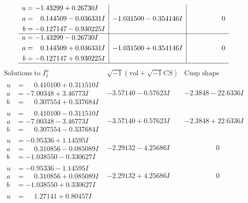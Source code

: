 \documentclass[1p]{elsarticle_modified}
\theoremstyle{definition}
\newcommand{\I}{\sqrt{-1}}
\begin{document}
$$\begin{array}{c|c|c}
\begin{aligned}
u &= -1.43299 + 0.26730 I \\
a &= \phantom{-}0.144509 - 0.036331 I \\
b &= -0.127147 - 0.930225 I\end{aligned}
 & -1.031500 - 0.354146 I & \phantom{-0.000000 } 0 \\ \hline\begin{aligned}
u &= -1.43299 - 0.26730 I \\
a &= \phantom{-}0.144509 + 0.036331 I \\
b &= -0.127147 + 0.930225 I\end{aligned}
 & -1.031500 + 0.354146 I & \phantom{-0.000000 } 0\\
 \hline 
 \end{array}$$\newpage$$\begin{array}{c|c|c}  
\text{Solutions to }I^u_{1}& \I (\text{vol} + \sqrt{-1}CS) & \text{Cusp shape}\\
 \hline 
\begin{aligned}
u &= \phantom{-}0.410100 + 0.311510 I \\
a &= -7.00348 + 3.46773 I \\
b &= \phantom{-}0.307554 + 0.337684 I\end{aligned}
 & -3.57140 - 0.57623 I & -2.3848 - 22.6336 I \\ \hline\begin{aligned}
u &= \phantom{-}0.410100 - 0.311510 I \\
a &= -7.00348 - 3.46773 I \\
b &= \phantom{-}0.307554 - 0.337684 I\end{aligned}
 & -3.57140 + 0.57623 I & -2.3848 + 22.6336 I \\ \hline\begin{aligned}
u &= -0.95336 + 1.14595 I \\
a &= \phantom{-}0.310856 - 0.085089 I \\
b &= -1.038550 - 0.330627 I\end{aligned}
 & -2.29132 - 4.25686 I & \phantom{-0.000000 } 0 \\ \hline\begin{aligned}
u &= -0.95336 - 1.14595 I \\
a &= \phantom{-}0.310856 + 0.085089 I \\
b &= -1.038550 + 0.330627 I\end{aligned}
 & -2.29132 + 4.25686 I & \phantom{-0.000000 } 0 \\ \hline\begin{aligned}
u &= \phantom{-}1.27141 + 0.80457 I \\

\end{aligned}
\end{array}$$
\end{document}
